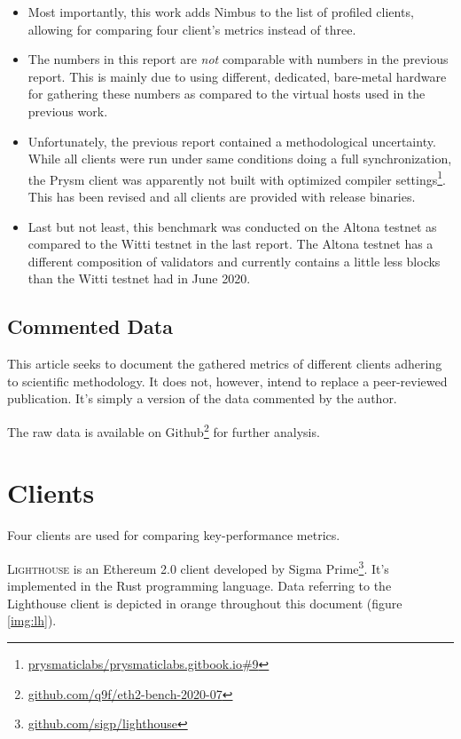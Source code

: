 \documentclass[twoside,twocolumn]{article}
\begin{document}
\begin{itemize}
\item Most importantly, this work adds Nimbus to the list of profiled clients, allowing for comparing four client's metrics instead of three.
\item The numbers in this report are \textit{not} comparable with numbers in the previous report. This is mainly due to using different, dedicated, bare-metal hardware for gathering these numbers as compared to the virtual hosts used in the previous work.
\item Unfortunately, the previous report contained a methodological uncertainty. While all clients were run under same conditions doing a full synchronization, the Prysm client was apparently not built with optimized compiler settings\footnote{\href{https://github.com/prysmaticlabs/prysmaticlabs.gitbook.io/issues/9}{prysmaticlabs/prysmaticlabs.gitbook.io\#9}}. This has been revised and all clients are provided with release binaries.
\item Last but not least, this benchmark was conducted on the Altona testnet as compared to the Witti testnet in the last report. The Altona testnet has a different composition of validators and currently contains a little less blocks than the Witti testnet had in June 2020.
\end{itemize}

\subsection{Commented Data}
This article seeks to document the gathered metrics of different clients adhering to scientific methodology. It does not, however, intend to replace a peer-reviewed publication. It's simply a version of the data commented by the author.\par

The raw data is available on Github\footnote{\href{https://github.com/q9f/eth2-bench-2020-07}{github.com/q9f/eth2-bench-2020-07}} for further analysis.

\section{Clients}
\label{sec:cli}

Four clients are used for comparing key-performance metrics.\par

\textsc{Lighthouse} is an Ethereum 2.0 client developed by Sigma Prime\footnote{\href{https://github.com/sigp/lighthouse}{github.com/sigp/lighthouse}}. It's implemented in the Rust programming language. Data referring to the Lighthouse client is depicted in orange throughout this document (figure \ref{img:lh}).\par
\end{document}
